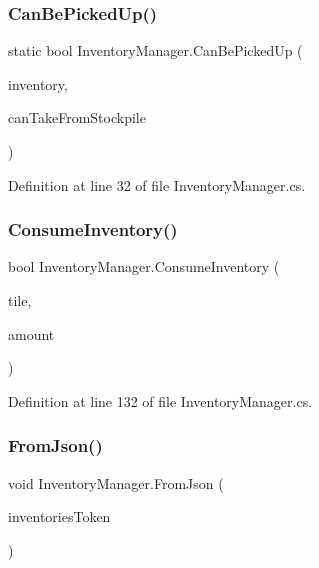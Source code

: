 \subsubsection{\texorpdfstring{Can\+Be\+Picked\+Up()}{CanBePickedUp()}}
{\footnotesize\ttfamily static bool Inventory\+Manager.\+Can\+Be\+Picked\+Up (\begin{DoxyParamCaption}\item[{\hyperlink{class_inventory}{Inventory}}]{inventory,  }\item[{bool}]{can\+Take\+From\+Stockpile }\end{DoxyParamCaption})\hspace{0.3cm}{\ttfamily [static]}}



Definition at line 32 of file Inventory\+Manager.\+cs.

\mbox{\label{class_inventory_manager_ac1aaa01a96f1c3c35683c3ce03663380}} 
\subsubsection{\texorpdfstring{Consume\+Inventory()}{ConsumeInventory()}}
{\footnotesize\ttfamily bool Inventory\+Manager.\+Consume\+Inventory (\begin{DoxyParamCaption}\item[{\hyperlink{class_tile}{Tile}}]{tile,  }\item[{int}]{amount }\end{DoxyParamCaption})}



Definition at line 132 of file Inventory\+Manager.\+cs.

\mbox{\label{class_inventory_manager_af330aa2148c2e803960a01f4a8ab9f73}} 
\subsubsection{\texorpdfstring{From\+Json()}{FromJson()}}
{\footnotesize\ttfamily void Inventory\+Manager.\+From\+Json (\begin{DoxyParamCaption}\item[{J\+Token}]{inventories\+Token }\end{DoxyParamCaption})}




